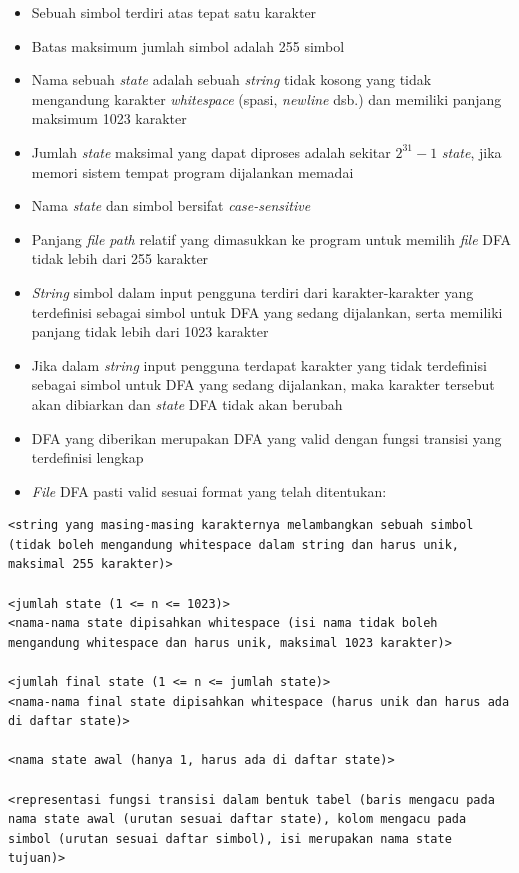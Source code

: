 \documentclass[a4paper,titlepage]{article}
\begin{document}
		\begin{itemize}
			\item Sebuah simbol terdiri atas tepat satu karakter
			\item Batas maksimum jumlah simbol adalah 255 simbol
			\item Nama sebuah \textit{state} adalah sebuah \textit{string} tidak kosong yang tidak mengandung karakter \textit{whitespace} (spasi, \textit{newline} dsb.) dan memiliki panjang maksimum 1023 karakter
			\item Jumlah \textit{state} maksimal yang dapat diproses adalah sekitar $2^{31}-1$ \textit{state}, jika memori sistem tempat program dijalankan memadai
			\item Nama \textit{state} dan simbol bersifat \textit{case-sensitive}
			\item Panjang \textit{file path} relatif yang dimasukkan ke program untuk memilih \textit{file} DFA tidak lebih dari 255 karakter
			\item \textit{String} simbol dalam input pengguna terdiri dari karakter-karakter yang terdefinisi sebagai simbol untuk DFA yang sedang dijalankan, serta memiliki panjang tidak lebih dari 1023 karakter
			\item Jika dalam \textit{string} input pengguna terdapat karakter yang tidak terdefinisi sebagai simbol untuk DFA yang sedang dijalankan, maka karakter tersebut akan dibiarkan dan \textit{state} DFA tidak akan berubah
			\item DFA yang diberikan merupakan DFA yang valid dengan fungsi transisi yang terdefinisi lengkap
			\item \textit{File} DFA pasti valid sesuai format yang telah ditentukan:
		\end{itemize}

		\begin{lstlisting}
<string yang masing-masing karakternya melambangkan sebuah simbol (tidak boleh mengandung whitespace dalam string dan harus unik, maksimal 255 karakter)>

<jumlah state (1 <= n <= 1023)>
<nama-nama state dipisahkan whitespace (isi nama tidak boleh mengandung whitespace dan harus unik, maksimal 1023 karakter)>

<jumlah final state (1 <= n <= jumlah state)>
<nama-nama final state dipisahkan whitespace (harus unik dan harus ada di daftar state)>

<nama state awal (hanya 1, harus ada di daftar state)>

<representasi fungsi transisi dalam bentuk tabel (baris mengacu pada nama state awal (urutan sesuai daftar state), kolom mengacu pada simbol (urutan sesuai daftar simbol), isi merupakan nama state tujuan)>
		\end{lstlisting}
\end{document}
